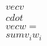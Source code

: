 \documentclass[preview]{standalone}
\begin{document}
\begin{align*}
\quad\\vec{v} \quad\\cdot \quad\\vec{w} = \quad\\sum v_i w_i
\end{align*}
\end{document}
